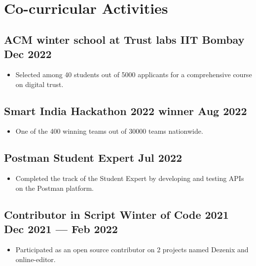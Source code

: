 \documentclass[a4,10pt]{article}
\newenvironment{zitemize}{
\begin{itemize}\itemsep0pt \parskip0pt \parsep1pt}
{\end{itemize}\vspace{-0.5cm}}
\begin{document}
\section{Co-curricular Activities}
\vspace{-0.1cm}
\subsection*{ACM winter school at Trust labs IIT Bombay \hfill Dec 2022}
\vspace{-0.05cm}
\begin{zitemize}
    \item Selected among 40 students out of 5000 applicants for a comprehensive course on digital trust.
    \vspace{-0.1cm}
\end{zitemize} 
\subsection*{Smart India Hackathon 2022 winner \hfill Aug 2022}
\vspace{-0.05cm}
\begin{zitemize}
    \item One of the 400 winning teams out of 30000 teams nationwide.
\end{zitemize} 
\vspace{-0.1cm}
\subsection*{Postman Student Expert \hfill Jul 2022}
\vspace{-0.05cm}
\begin{zitemize}
    \item Completed the track of the Student Expert by developing and testing APIs on the Postman platform.
    \end{zitemize}
\vspace{-0.1cm}
\subsection*{Contributor in Script Winter of Code 2021 \hfill Dec 2021 --- Feb 2022}
\vspace{-0.05cm}
    \begin{zitemize}
    \item Participated as an open source contributor on 2 projects named Dezenix and online-editor.
    \end{zitemize}
\vspace{-0.1cm}
\end{document}
